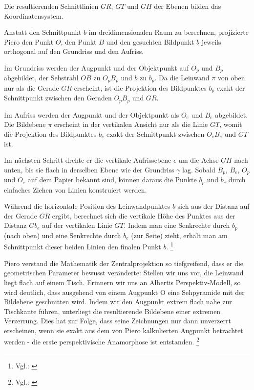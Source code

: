 Die resultierenden Schnittlinien $GR$, $GT$ und $GH$ der Ebenen bilden das Koordinatensystem.

Anstatt den Schnittpunkt $b$ im dreidimensionalen Raum zu berechnen, projizierte Piero den Punkt $O$, den Punkt $B$ und den gesuchten Bildpunkt $b$ jeweils orthogonal auf den Grundriss und den Aufriss. 

Im Grundriss werden der Augpunkt und der Objektpunkt auf $O_p$ und $B_p$ abgebildet, der Sehstrahl $OB$ zu $O_pB_p$ und $b$ zu $b_p$. Da die Leinwand $\pi$ von oben nur als die Gerade $GR$ erscheint, ist die Projektion des Bildpunktes $b_p$ exakt der Schnittpunkt zwischen den Geraden $O_pB_p$ und $GR$. 

Im Aufriss werden der Augpunkt und der Objektpunkt als $O_e$ und $B_e$ abgebildet. Die Bildebene $\pi$ erscheint in der vertikalen Ansicht nur als die Linie $GT$, womit die Projektion des Bildpunktes $b_e$ exakt der Schnittpunkt zwischen $O_eB_e$ und $GT$ ist.

Im nächsten Schritt drehte er die vertikale Aufrissebene $\epsilon$ um die Achse $GH$ nach unten, bis sie flach in derselben Ebene wie der Grundriss $\gamma$ lag. Sobald $B_p$, $B_e$, $O_p$ und $O_e$ auf dem Papier bekannt sind, können daraus die Punkte $b_p$ und $b_e$ durch einfaches Ziehen von Linien konstruiert werden. 

Während die horizontale Position des Leinwandpunktes $b$ sich aus der Distanz auf der Gerade $GR$ ergibt, berechnet sich die vertikale Höhe des Punktes aus der Distanz $Gb_e$ auf der vertikalen Linie $GT$. Indem man eine Senkrechte durch $b_p$ (nach oben) und eine Senkrechte durch $b_e$ (zur Seite) zieht, erhält man am Schnittpunkt dieser beiden Linien den finalen Punkt $b$. \footnote{Vgl.: \cite[S. 60-63]{Andersen2007}}

Piero verstand die Mathematik der Zentralprojektion so tiefgreifend, dass er die geometrischen Parameter bewusst veränderte: Stellen wir uns vor, die Leinwand liegt flach auf einem Tisch. Erinnern wir uns an Albertis Perspektiv-Modell, so wird deutlich, dass ausgehend von einem Augpunkt O eine Sehpyramide mit der Bildebene geschnitten wird. Indem wir den Augpunkt extrem flach nahe zur Tischkante führen, unterliegt die resultierende Bildebene einer extremen Verzerrung. Dies hat zur Folge, dass seine Zeichnungen nur dann unverzerrt erscheinen, wenn sie exakt aus dem von Piero kalkulierten Augpunkt betrachtet werden - die erste perspektivische Anamorphose ist entstanden. \footnote{Vgl.: \cite[S. 74-75]{Andersen2007}}

